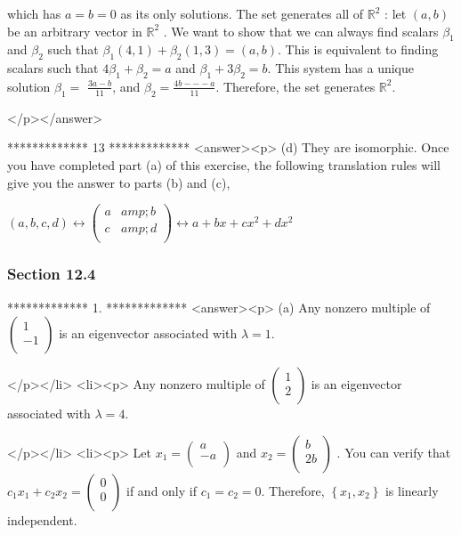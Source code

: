 which has \(a = b = 0\) as its only solutions. The set generates all of \(\mathbb{R}^2\) : let \((a, b)\) be an arbitrary vector in \(\mathbb{R}^2\)
. We want to show that we can always find scalars \(\beta _1\) and \(\beta _2\) such that \(\beta _1(4, 1) +\beta _2 (1,3) = (a, b)\). This is equivalent
to finding scalars such that \(4\beta _1 +\beta _2 = a\) and \(\beta _1 + 3\beta _2 = b\). This system has a unique solution  \(\beta _1=\text{
 }\frac{3a - b}{11}\), and \(\beta _2= \frac{4b --- a}{11}\). Therefore, the set generates \(\mathbb{R}^2\).

</p></answer>


*************
13
*************
<answer><p> (d) They are isomorphic. Once you have completed part (a) of this exercise, the following translation rules will give you the answer to parts
(b) and (c),



\((a,b,c,d) \leftrightarrow  \left(
\begin{array}{cc}
 a &amp; b \\
 c &amp; d \\
\end{array}
\right)\leftrightarrow  a + b x+c x^2+ d x^2\)


\subsubsection{Section 12.4}

*************
1.
*************
<answer><p> (a) Any nonzero multiple of \(\left(
\begin{array}{c}
 1 \\
 -1 \\
\end{array}
\right)\) is an eigenvector associated with \(\lambda =1\).

</p></li>
<li><p>  Any nonzero multiple of \(\left(
\begin{array}{c}
 1 \\
 2 \\
\end{array}
\right)\) is an eigenvector associated with \(\lambda =4\).

</p></li>
<li><p>  Let \(x_1=\left(
\begin{array}{c}
 a \\
 -a \\
\end{array}
\right)\) and \(x_2=\left(
\begin{array}{c}
 b \\
 2b \\
\end{array}
\right)\) .  You can verify that  \(c_1x_1+ c_2x_2=\left(
\begin{array}{c}
 0 \\
 0 \\
\end{array}
\right)\)  if and only if \(c_1= c_2= 0.\)  Therefore, \(\left\{x_1,x_2\right\}\) is linearly independent.

